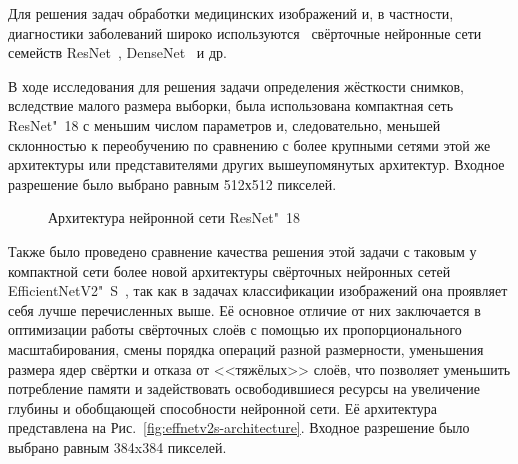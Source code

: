 Для решения задач обработки медицинских изображений и, в частности, диагностики заболеваний широко используются~\cite{oloko2022systematic} свёрточные нейронные сети семейств ResNet~\cite{he2016deep}, DenseNet~\cite{huang2017densely} и др.

В ходе исследования для решения задачи определения жёсткости снимков, вследствие малого размера выборки, была использована компактная сеть ResNet"~18 с меньшим числом параметров и, следовательно, меньшей склонностью к переобучению по сравнению с более крупными сетями этой же архитектуры или представителями других вышеупомянутых архитектур. Входное разрешение было выбрано равным 512х512 пикселей.

\begin{figure}[ht]
	\caption{Архитектура нейронной сети ResNet"~18~\cite{ramzan2020deep}}
	\label{fig:resnet18-architecture}
\end{figure}

Также было проведено сравнение качества решения этой задачи с таковым у компактной сети более новой архитектуры свёрточных нейронных сетей EfficientNetV2"~S~\cite{tan2021efficientnetv2}, так как в задачах классификации изображений она проявляет себя лучше перечисленных выше. Её основное отличие от них заключается в оптимизации работы свёрточных слоёв с помощью их пропорционального масштабирования, смены порядка операций разной размерности, уменьшения размера ядер свёртки и отказа от <<тяжёлых>> слоёв, что позволяет уменьшить потребление памяти и задействовать освободившиеся ресурсы на увеличение глубины и обобщающей способности нейронной сети. Её архитектура представлена на Рис.~\ref{fig:effnetv2s-architecture}. Входное разрешение было выбрано равным 384x384 пикселей.

